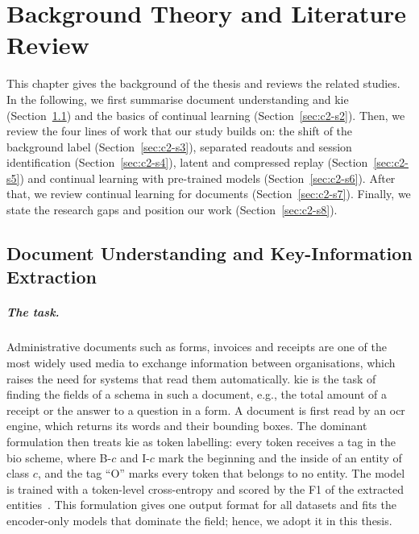 \chapter{Background Theory and Literature Review}
\label{ch:background}

This chapter gives the background of the thesis and reviews the related studies. In the
following, we first summarise document understanding and \gls{kie}
(Section~\ref{sec:c2-s1}) and the basics of continual learning (Section~\ref{sec:c2-s2}).
Then, we review the four lines of work that our study builds on: the shift of the background
label (Section~\ref{sec:c2-s3}), separated readouts and session identification
(Section~\ref{sec:c2-s4}), latent and compressed replay (Section~\ref{sec:c2-s5}) and
continual learning with pre-trained models (Section~\ref{sec:c2-s6}). After that, we review
continual learning for documents (Section~\ref{sec:c2-s7}). Finally, we state the research
gaps and position our work (Section~\ref{sec:c2-s8}).

\section{Document Understanding and Key-Information Extraction}
\label{sec:c2-s1}

\paragraph{The task.} Administrative documents such as forms, invoices and receipts are one
of the most widely used media to exchange information between organisations, which raises
the need for systems that read them automatically. \Gls{kie} is the task of finding the
fields of a schema in such a document, e.g., the total amount of a receipt or the answer to
a question in a form. A document is first read by an \gls{ocr} engine, which returns its
words and their bounding boxes. The dominant formulation then treats \gls{kie} as token
labelling: every token receives a tag in the \gls{bio} scheme, where B-$c$ and I-$c$ mark
the beginning and the inside of an entity of class $c$, and the tag ``O'' marks every token
that belongs to no entity. The model is trained with a token-level cross-entropy and scored
by the F1 of the extracted entities~\citep{tjong2003conll}. This formulation gives one
output format for all datasets and fits the encoder-only models that dominate the field;
hence, we adopt it in this thesis.


